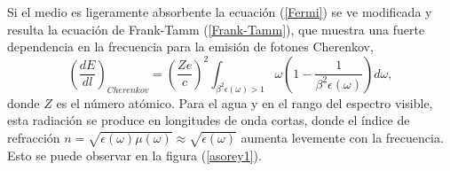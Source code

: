 \documentclass[12pt,oneside,openany,letter]{book}
\begin{document}
Si el medio es ligeramente absorbente la ecuación (\ref{Fermi}) se ve modificada y resulta la ecuación de Frank-Tamm (\ref{Frank-Tamm}), que muestra una fuerte dependencia en la frecuencia para la emisión de fotones Cherenkov,
\begin{equation}
\label{Frank-Tamm}
\left ( \frac{dE}{dl} \right )_{Cherenkov} = \left(\frac{Z e}{c} \right)^2  \int_{\beta^2\epsilon(\omega)>1}  \omega \left (1- \frac{1}{\beta^2\epsilon(\omega)}\right ) d\omega,
\end{equation}
donde $Z$ es el n\'umero at\'omico. Para el agua y en el rango del espectro visible, esta radiación se produce en longitudes de onda cortas, donde el índice de refracción $n= \sqrt{\epsilon(\omega) \mu(\omega)} \approx \sqrt{\epsilon(\omega)}$ aumenta levemente con la frecuencia. Esto se puede observar en la figura (\ref{asorey1}).
\end{document}
